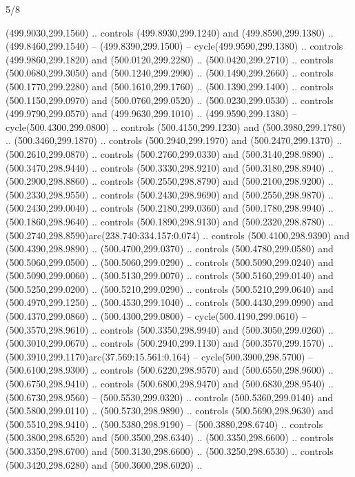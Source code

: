 \begin{flagdescription}{5/8}
\begin{scope}[xshift=0.5\flaglength,yshift=0.5\flagwidth,scale=\flagwidth/475.63]
\begin{scope}[y=0.8pt, x=0.8pt, yscale=-1, xscale=1,shift={(-450,-300)}]
\begin{scope}[cm={{1.0,0.0,0.0,1.0,(-0.0002,0.12556)}},cm={{1.0,0.0,0.0,1.0,(0.00179,0.0)}}]
\begin{scope}[cm={{1.11592,0.0,0.0,1.11592,(-106.89933,-41.77764)}}]
\begin{scope}[draw=black,fill=cfff]
\begin{scope}[fill=black]
  (499.9030,299.1560) .. controls (499.8930,299.1240) and (499.8590,299.1380) ..
  (499.8460,299.1540) -- (499.8390,299.1500) -- cycle(499.9590,299.1380) ..
  controls (499.9860,299.1820) and (500.0120,299.2280) .. (500.0420,299.2710) ..
  controls (500.0680,299.3050) and (500.1240,299.2990) .. (500.1490,299.2660) ..
  controls (500.1770,299.2280) and (500.1610,299.1760) .. (500.1390,299.1400) ..
  controls (500.1150,299.0970) and (500.0760,299.0520) .. (500.0230,299.0530) ..
  controls (499.9790,299.0570) and (499.9630,299.1010) .. (499.9590,299.1380) --
  cycle(500.4300,299.0800) .. controls (500.4150,299.1230) and
  (500.3980,299.1780) .. (500.3460,299.1870) .. controls (500.2940,299.1970) and
  (500.2470,299.1370) .. (500.2610,299.0870) .. controls (500.2760,299.0330) and
  (500.3140,298.9890) .. (500.3470,298.9440) .. controls (500.3330,298.9210) and
  (500.3180,298.8940) .. (500.2900,298.8860) .. controls (500.2550,298.8790) and
  (500.2100,298.9200) .. (500.2330,298.9550) .. controls (500.2430,298.9690) and
  (500.2550,298.9870) .. (500.2430,299.0040) .. controls (500.2180,299.0360) and
  (500.1780,298.9940) .. (500.1860,298.9640) .. controls (500.1890,298.9130) and
  (500.2320,298.8780) .. (500.2740,298.8590)arc(238.740:334.157:0.074) ..
  controls (500.4100,298.9390) and (500.4390,298.9890) .. (500.4700,299.0370) ..
  controls (500.4780,299.0580) and (500.5060,299.0500) .. (500.5060,299.0290) ..
  controls (500.5090,299.0240) and (500.5090,299.0060) .. (500.5130,299.0070) ..
  controls (500.5160,299.0140) and (500.5250,299.0200) .. (500.5210,299.0290) ..
  controls (500.5210,299.0640) and (500.4970,299.1250) .. (500.4530,299.1040) ..
  controls (500.4430,299.0990) and (500.4370,299.0860) .. (500.4300,299.0800) --
  cycle(500.4190,299.0610) -- (500.3570,298.9610) .. controls
  (500.3350,298.9940) and (500.3050,299.0260) .. (500.3010,299.0670) .. controls
  (500.2940,299.1130) and (500.3570,299.1570) ..
  (500.3910,299.1170)arc(37.569:15.561:0.164) -- cycle(500.3900,298.5700) --
  (500.6100,298.9300) .. controls (500.6220,298.9570) and (500.6550,298.9600) ..
  (500.6750,298.9410) .. controls (500.6800,298.9470) and (500.6830,298.9540) ..
  (500.6730,298.9560) -- (500.5530,299.0320) .. controls (500.5360,299.0140) and
  (500.5800,299.0110) .. (500.5730,298.9890) .. controls (500.5690,298.9630) and
  (500.5510,298.9410) .. (500.5380,298.9190) -- (500.3880,298.6740) .. controls
  (500.3800,298.6520) and (500.3500,298.6340) .. (500.3350,298.6600) .. controls
  (500.3350,298.6700) and (500.3130,298.6600) .. (500.3250,298.6530) .. controls
  (500.3420,298.6280) and (500.3600,298.6020) ..

\end{scope}
\end{scope}
\end{scope}
\end{scope}
\end{scope}
\end{scope}
\end{flagdescription}
